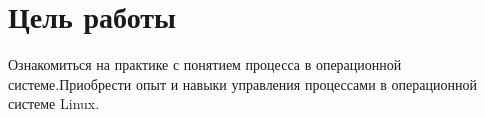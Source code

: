 \thispagestyle{empty}
\section*{Цель работы}

Ознакомиться на практике с понятием процесса в операционной системе.Приобрести опыт и навыки управления процессами в операционной системе Linux. 